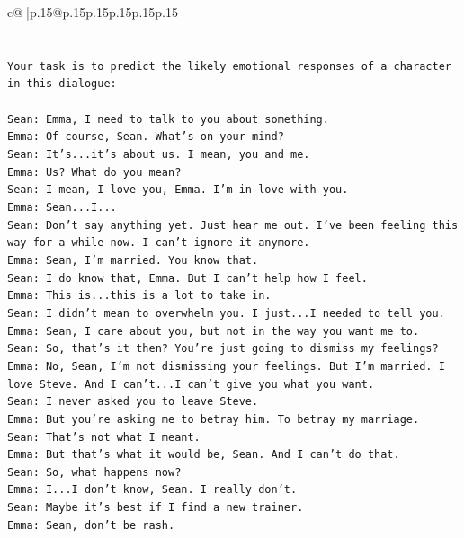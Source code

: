 \documentclass{article}
\begin{document}
{\begin{supertabular}{c@{$\;$}|p{.15\linewidth}@{}p{.15\linewidth}p{.15\linewidth}p{.15\linewidth}p{.15\linewidth}p{.15\linewidth}}
{{{\\ 
\\ 
\\ 
\texttt{Your task is to predict the likely emotional responses of a character in this dialogue:} \\
\\ 
\texttt{Sean: Emma, I need to talk to you about something.} \\
\texttt{Emma: Of course, Sean. What's on your mind?} \\
\texttt{Sean: It's...it's about us. I mean, you and me.} \\
\texttt{Emma: Us? What do you mean?} \\
\texttt{Sean: I mean, I love you, Emma. I'm in love with you.} \\
\texttt{Emma: Sean...I...} \\
\texttt{Sean: Don't say anything yet. Just hear me out. I've been feeling this way for a while now. I can't ignore it anymore.} \\
\texttt{Emma: Sean, I'm married. You know that.} \\
\texttt{Sean: I do know that, Emma. But I can't help how I feel.} \\
\texttt{Emma: This is...this is a lot to take in.} \\
\texttt{Sean: I didn't mean to overwhelm you. I just...I needed to tell you.} \\
\texttt{Emma: Sean, I care about you, but not in the way you want me to.} \\
\texttt{Sean: So, that's it then? You're just going to dismiss my feelings?} \\
\texttt{Emma: No, Sean, I'm not dismissing your feelings. But I'm married. I love Steve. And I can't...I can't give you what you want.} \\
\texttt{Sean: I never asked you to leave Steve.} \\
\texttt{Emma: But you're asking me to betray him. To betray my marriage.} \\
\texttt{Sean: That's not what I meant.} \\
\texttt{Emma: But that's what it would be, Sean. And I can't do that.} \\
\texttt{Sean: So, what happens now?} \\
\texttt{Emma: I...I don't know, Sean. I really don't.} \\
\texttt{Sean: Maybe it's best if I find a new trainer.} \\
\texttt{Emma: Sean, don't be rash.} \\
}}}
\end{supertabular}}
\end{document}
